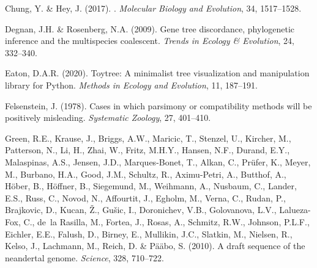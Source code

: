 \documentclass[11pt]{article}
\begin{document}
\begin{thebibliography}{25}
Chung, Y. \& Hey, J. (2017).
.
\newblock \emph{Molecular Biology and Evolution}, 34, 1517--1528.

Degnan, J.H. \& Rosenberg, N.A. (2009).
\newblock Gene tree discordance, phylogenetic inference and the multispecies
  coalescent.
\newblock \emph{Trends in Ecology \& Evolution}, 24, 332--340.

Eaton, D.A.R. (2020).
\newblock Toytree: {A} minimalist tree visualization and manipulation library
  for {Python}.
\newblock \emph{Methods in Ecology and Evolution}, 11, 187--191.

Felsenstein, J. (1978).
\newblock Cases in which parsimony or compatibility methods will be positively
  misleading.
\newblock \emph{Systematic Zoology}, 27, 401--410.

Green, R.E., Krause, J., Briggs, A.W., Maricic, T., Stenzel, U., Kircher, M.,
  Patterson, N., Li, H., Zhai, W., Fritz, M.H.Y., Hansen, N.F., Durand, E.Y.,
  Malaspinas, A.S., Jensen, J.D., Marques-Bonet, T., Alkan, C., Pr{\"u}fer, K.,
  Meyer, M., Burbano, H.A., Good, J.M., Schultz, R., Aximu-Petri, A., Butthof,
  A., H{\"o}ber, B., H{\"o}ffner, B., Siegemund, M., Weihmann, A., Nusbaum, C.,
  Lander, E.S., Russ, C., Novod, N., Affourtit, J., Egholm, M., Verna, C.,
  Rudan, P., Brajkovic, D., Kucan, {\v Z}., Gu{\v s}ic, I., Doronichev, V.B.,
  Golovanova, L.V., Lalueza-Fox, C., de~la Rasilla, M., Fortea, J., Rosas, A.,
  Schmitz, R.W., Johnson, P.L.F., Eichler, E.E., Falush, D., Birney, E.,
  Mullikin, J.C., Slatkin, M., Nielsen, R., Kelso, J., Lachmann, M., Reich, D.
  \& P{\"a}{\"a}bo, S. (2010).
\newblock A draft sequence of the neandertal genome.
\newblock \emph{Science}, 328, 710--722.


\end{thebibliography}
\end{document}
